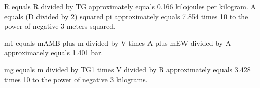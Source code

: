 R equals R divided by TG approximately equals 0.166 kilojoules per kilogram. A equals (D divided by 2) squared pi approximately equals 7.854 times 10 to the power of negative 3 meters squared.

m1 equals mAMB plus m divided by V times A plus mEW divided by A approximately equals 1.401 bar.

mg equals m divided by TG1 times V divided by R approximately equals 3.428 times 10 to the power of negative 3 kilograms.